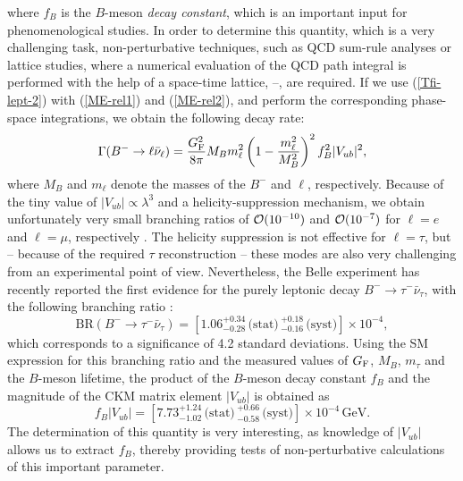 \documentclass[11pt]{cernrep}
\begin{document}
where $f_B$ is the $B$-meson {\it decay constant}, which is an important
input for phenomenological studies. In order to determine this
quantity, which is a very challenging task, non-perturbative 
techniques, such as QCD sum-rule analyses \cite{khodjamirian} or 
lattice studies, where a numerical evaluation of the QCD path integral is 
performed with the help of a space-time lattice, \cite{luscher}--\cite{luscher-rev}, 
are required.  If we use (\ref{Tfi-lept-2}) with (\ref{ME-rel1}) and 
(\ref{ME-rel2}), and perform the corresponding phase-space integrations, 
we obtain the following decay rate:
\begin{equation}
\Gamma(B^-\to\ell \bar \nu_\ell)=\frac{G_{\rm F}^2}{8\pi}
M_Bm_\ell^2\left(1-\frac{m_\ell^2}{M_B^2}\right)^2f_B^2|V_{ub}|^2 ,
\end{equation}
where $M_B$ and $m_\ell$ denote the masses of the $B^-$ and $\ell$,
respectively. Because of the tiny value of $|V_{ub}|\propto\lambda^3$ 
and a helicity-suppression mechanism, we obtain unfortunately very small 
branching ratios of ${\cal O}(10^{-10})$ and ${\cal O}(10^{-7})$ for 
$\ell=e$ and $\ell=\mu$, respectively \cite{fulvia}. The helicity 
suppression is not effective for $\ell=\tau$, but -- because of the 
required $\tau$ reconstruction -- these modes are also very challenging from 
an experimental point of view. Nevertheless, the Belle experiment has recently
reported the first evidence for the purely leptonic decay 
$B^- \to \tau^- \bar\nu_\tau$, with the following branching ratio \cite{Belle-leptonic}:
\begin{equation}
\mbox{BR}(B^- \to \tau^- \bar\nu_\tau) = \left[1.06 ^{+0.34}_{-0.28} \,
\mbox{(stat)} \,  ^{+0.18}_{-0.16} \, \mbox{(syst)}\right]\times 10^{-4},
\end{equation}
which corresponds to a significance of 4.2 standard deviations. Using the
SM expression for this branching ratio and the measured values of
$G_{\rm F}$, $M_B$, $m_\tau$ and the $B$-meson lifetime, the 
product of the $B$-meson decay constant $f_B$ and the magnitude of the
CKM matrix element $|V_{ub}|$ is obtained as
\begin{equation}%
f_B|V_{ub}|=\left[7.73^{+1.24}_{-1.02}\,
\mbox{(stat)} \,  ^{+0.66}_{-0.58} \, \mbox{(syst)}\right]\times 10^{-4} \, \mbox{GeV}.
\end{equation}
The determination of this quantity is very interesting, as knowledge of $|V_{ub}|$
allows us to extract $f_B$, thereby providing tests of non-perturbative calculations 
of this important parameter. 
\end{document}
